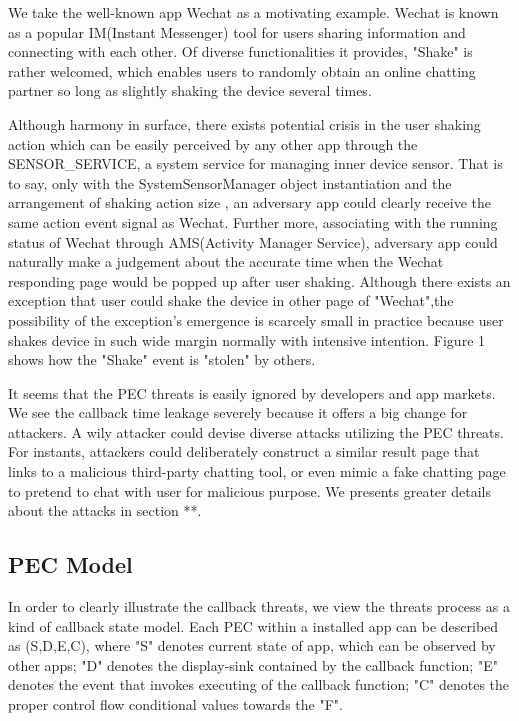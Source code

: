 \documentclass{sig-alternate-05-2015}
\begin{document}
We take the well-known app Wechat as a motivating example. Wechat is known as a popular IM(Instant Messenger) tool for users sharing information and connecting with each other. Of diverse functionalities it provides, "Shake" is rather welcomed, which enables users to randomly obtain an online chatting partner so long as slightly shaking the device several times.

Although harmony in surface, there exists potential crisis in the user shaking action which can be easily perceived by any other app through the {\color{red}SENSOR\_SERVICE}, a system service for managing inner device sensor. That is to say, only with the {\color{red}SystemSensorManager} object instantiation and the arrangement of shaking action size , an adversary app could clearly receive the same action event signal as Wechat. Further more, associating with the running status of Wechat through {\color{red}AMS(Activity Manager Service)}, adversary app could naturally make a judgement about the accurate time when the Wechat responding page would be popped up after user shaking. Although there exists an exception that user could shake the device in other page of "Wechat",the possibility of the exception's emergence is scarcely small in practice because user shakes device in such wide margin normally with intensive intention. {\color{red}Figure 1} shows how the "Shake" event is "stolen" by others. 

It seems that the PEC threats is easily ignored by developers and app markets. We see the callback time leakage severely because it offers a big change for attackers. A wily attacker could devise diverse attacks utilizing the PEC threats. For instants, attackers could deliberately construct a similar result page that links to a malicious third-party chatting tool, or even mimic a fake chatting page to pretend to chat with user for malicious purpose. We presents greater details about the attacks in section **.

\subsection{PEC Model} 

In order to clearly illustrate the callback threats, we view the threats process as a kind of callback state model. Each PEC within a installed app can be described as (S,D,E,C), where "S" denotes current state of app, which can be observed by other apps; "D" denotes the display-sink contained by the callback function; "E" denotes the event that invokes executing of the callback function; "C" denotes the proper control flow conditional values towards the "F".
\end{document}

